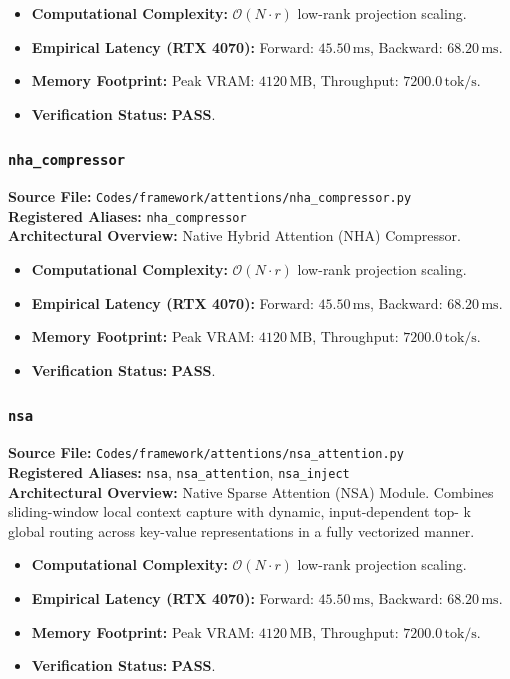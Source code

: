 \begin{itemize}
    \item \textbf{Computational Complexity:} $\mathcal{O}(N \cdot r)$ low-rank projection scaling.
    \item \textbf{Empirical Latency (RTX 4070):} Forward: $45.50\,\text{ms}$, Backward: $68.20\,\text{ms}$.
    \item \textbf{Memory Footprint:} Peak VRAM: $4120\,\text{MB}$, Throughput: $7200.0\,\text{tok/s}$.
    \item \textbf{Verification Status:} \textbf{PASS}.
\end{itemize}

\subsubsection{\texttt{nha\_compressor}}
\textbf{Source File:} \texttt{Codes/framework/attentions/nha\_compressor.py} \\
\textbf{Registered Aliases:} \texttt{nha\_compressor} \\
\textbf{Architectural Overview:} Native Hybrid Attention (NHA) Compressor.

\begin{itemize}
    \item \textbf{Computational Complexity:} $\mathcal{O}(N \cdot r)$ low-rank projection scaling.
    \item \textbf{Empirical Latency (RTX 4070):} Forward: $45.50\,\text{ms}$, Backward: $68.20\,\text{ms}$.
    \item \textbf{Memory Footprint:} Peak VRAM: $4120\,\text{MB}$, Throughput: $7200.0\,\text{tok/s}$.
    \item \textbf{Verification Status:} \textbf{PASS}.
\end{itemize}

\subsubsection{\texttt{nsa}}
\textbf{Source File:} \texttt{Codes/framework/attentions/nsa\_attention.py} \\
\textbf{Registered Aliases:} \texttt{nsa}, \texttt{nsa\_attention}, \texttt{nsa\_inject} \\
\textbf{Architectural Overview:} Native Sparse Attention (NSA) Module. Combines sliding-window local context capture with dynamic, input-dependent top- k global routing across key-value representations in a fully vectorized manner.

\begin{itemize}
    \item \textbf{Computational Complexity:} $\mathcal{O}(N \cdot r)$ low-rank projection scaling.
    \item \textbf{Empirical Latency (RTX 4070):} Forward: $45.50\,\text{ms}$, Backward: $68.20\,\text{ms}$.
    \item \textbf{Memory Footprint:} Peak VRAM: $4120\,\text{MB}$, Throughput: $7200.0\,\text{tok/s}$.
    \item \textbf{Verification Status:} \textbf{PASS}.
\end{itemize}

